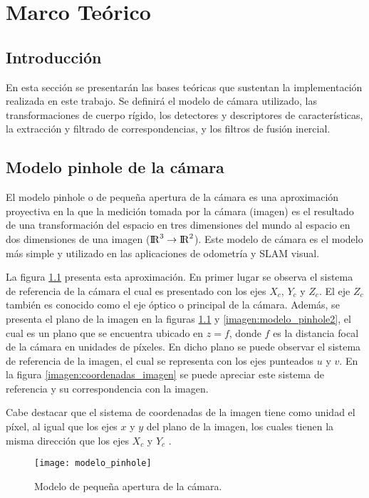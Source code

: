 \chapter{Marco Teórico}
\label{capitulo3}


\section{Introducción}

En esta sección se presentarán las bases teóricas que sustentan la implementación realizada en este trabajo. Se definirá el modelo de cámara utilizado, las transformaciones de cuerpo rígido, los detectores y descriptores de características, la extracción y filtrado de correspondencias, y los filtros de fusión inercial.


\section{Modelo pinhole de la cámara}
El modelo pinhole o de pequeña apertura de la cámara es una aproximación proyectiva en la que la medición tomada por la cámara (imagen) es el resultado de una transformación del espacio en tres dimensiones del mundo  al espacio en dos dimensiones de una imagen (${\rm I\!R}^3 \to {\rm I\!R}^2$). Este modelo de cámara es el modelo más simple y utilizado en las aplicaciones de odometría y SLAM visual.

La figura  \ref{imagen:modelo_pinhole}  presenta esta aproximación. En primer lugar se observa el sistema de referencia de la cámara el cual es presentado con los ejes $X_{c}$, $Y_{c}$ y $Z_{c}$. El eje $Z_{c}$ también es conocido como el eje óptico o principal de la cámara. Además, se presenta el plano de la imagen en la figuras \ref{imagen:modelo_pinhole} y \ref{imagen:modelo_pinhole2}, el cual es un plano que se encuentra ubicado en $z= f$, donde $f$ es la distancia focal de la cámara en unidades de píxeles. En dicho plano se puede observar el sistema de referencia de la imagen, el cual se representa con los ejes punteados $u$ y $v$. En la figura \ref{imagen:coordenadas_imagen} se puede apreciar este sistema de referencia y su correspondencia con la imagen.

Cabe destacar que el sistema de coordenadas de la imagen tiene como unidad el píxel, al igual que los ejes $x$ y $y$ del plano de la imagen, los cuales tienen la misma dirección que los ejes $X_{c}$ y $Y_{c}$ .


\begin{figure}[H]
	\centering
	\texttt{[image: modelo\_pinhole]}
	\caption[Modelo de apertura pequeña de la cámara]{Modelo de  pequeña apertura de la cámara\protect\footnotemark.}
	\label{imagen:modelo_pinhole}
\end{figure}

